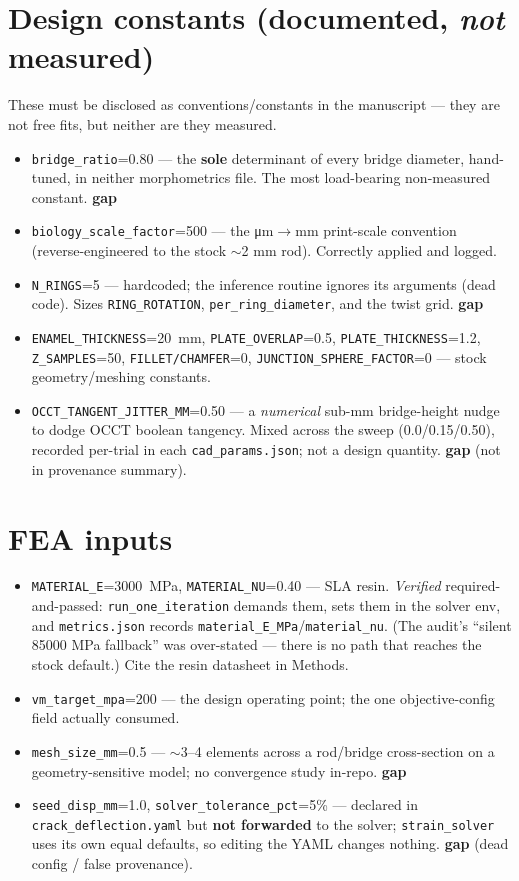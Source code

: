 \documentclass[11pt]{article}
\newcommand{\param}[1]{\texttt{#1}}
\newcommand{\sGap}{\textcolor{BrickRed}{\textbf{gap}}}
\begin{document}
\section{Design constants (documented, \emph{not} measured)}
These must be disclosed as conventions/constants in the manuscript --- they are not free fits, but neither are they measured.
\begin{itemize}[leftmargin=1.4em]
\item \param{bridge\_ratio}=0.80 --- the \textbf{sole} determinant of every bridge diameter, hand-tuned, in neither morphometrics file. The most load-bearing non-measured constant. \sGap
\item \param{biology\_scale\_factor}=500 --- the \si{\micro\meter}$\to$mm print-scale convention (reverse-engineered to the stock $\sim$2 mm rod). Correctly applied and logged.
\item \param{N\_RINGS}=5 --- hardcoded; the inference routine ignores its arguments (dead code). Sizes \param{RING\_ROTATION}, \param{per\_ring\_diameter}, and the twist grid. \sGap
\item \param{ENAMEL\_THICKNESS}=\SI{20}{mm}, \param{PLATE\_OVERLAP}=0.5, \param{PLATE\_THICKNESS}=1.2, \param{Z\_SAMPLES}=50, \param{FILLET/CHAMFER}=0, \param{JUNCTION\_SPHERE\_FACTOR}=0 --- stock geometry/meshing constants.
\item \param{OCCT\_TANGENT\_JITTER\_MM}=0.50 --- a \emph{numerical} sub-mm bridge-height nudge to dodge OCCT boolean tangency. Mixed across the sweep (0.0/0.15/0.50), recorded per-trial in each \texttt{cad\_params.json}; not a design quantity. \sGap{} (not in provenance summary).
\end{itemize}

\section{FEA inputs}
\begin{itemize}[leftmargin=1.4em]
\item \param{MATERIAL\_E}=\SI{3000}{MPa}, \param{MATERIAL\_NU}=0.40 --- SLA resin. \emph{Verified} required-and-passed: \texttt{run\_one\_iteration} demands them, sets them in the solver env, and \texttt{metrics.json} records \texttt{material\_E\_MPa}/\texttt{material\_nu}. (The audit's ``silent 85000 MPa fallback'' was over-stated --- there is no path that reaches the stock default.) Cite the resin datasheet in Methods.
\item \param{vm\_target\_mpa}=200 --- the design operating point; the one objective-config field actually consumed.
\item \param{mesh\_size\_mm}=0.5 --- $\sim$3--4 elements across a rod/bridge cross-section on a geometry-sensitive model; no convergence study in-repo. \sGap
\item \param{seed\_disp\_mm}=1.0, \param{solver\_tolerance\_pct}=5\% --- declared in \texttt{crack\_deflection.yaml} but \textbf{not forwarded} to the solver; \texttt{strain\_solver} uses its own equal defaults, so editing the YAML changes nothing. \sGap{} (dead config / false provenance).
\end{itemize}
\end{document}

